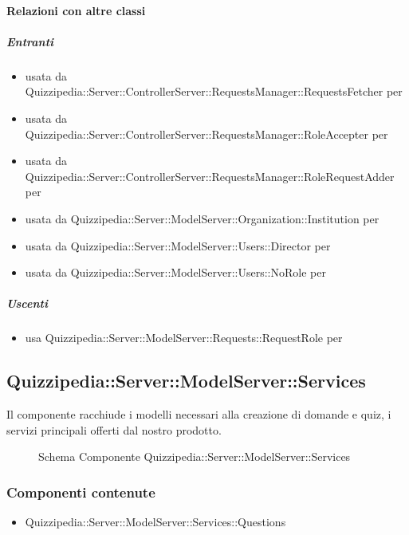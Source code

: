 \paragraph{Relazioni con altre classi}
\subparagraph{Entranti}
\begin{itemize}
\item usata da Quizzipedia::Server::ControllerServer::RequestsManager::RequestsFetcher per 
\item usata da Quizzipedia::Server::ControllerServer::RequestsManager::RoleAccepter per 
\item usata da Quizzipedia::Server::ControllerServer::RequestsManager::RoleRequestAdder per 
\item usata da Quizzipedia::Server::ModelServer::Organization::Institution per 
\item usata da Quizzipedia::Server::ModelServer::Users::Director per 
\item usata da Quizzipedia::Server::ModelServer::Users::NoRole per 
\end{itemize}
\subparagraph{Uscenti}
\begin{itemize}
\item usa Quizzipedia::Server::ModelServer::Requests::RequestRole per 
\end{itemize}
\subsection{Quizzipedia::Server::ModelServer::Services}
Il componente racchiude i modelli necessari alla creazione di domande e quiz, i servizi principali offerti dal nostro prodotto.
\begin{figure}[H]
\centering
\noindent{}
\caption[Schema Componente Quizzipedia::Server::ModelServer::Services]{Schema Componente Quizzipedia::Server::ModelServer::Services}
\end{figure}
\subsubsection{Componenti contenute}
\begin{itemize}
\item Quizzipedia::Server::ModelServer::Services::Questions
\end{itemize}
